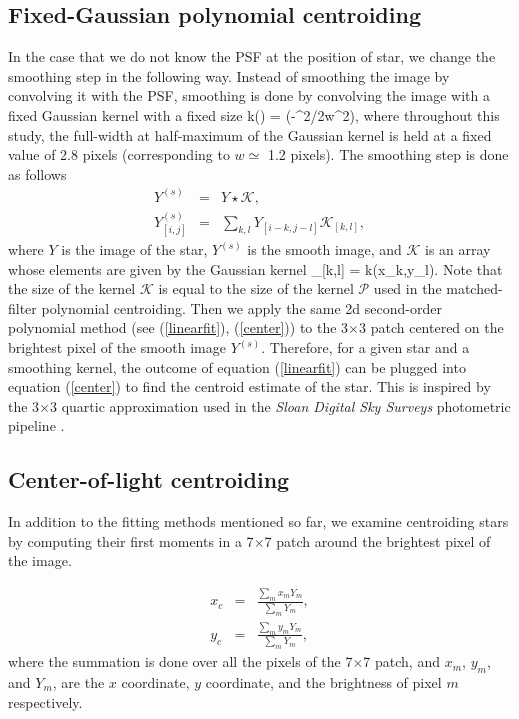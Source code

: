 \subsection{Fixed-Gaussian polynomial centroiding}
In the case that we do not know the PSF at the position of star, we change 
the smoothing step in the following way. Instead of smoothing the image 
by convolving it with the PSF, smoothing is done by convolving the image 
with a fixed Gaussian kernel with a fixed size 
\beq
k() = \exp(-^{2}/2w^{2}),
\label{eq:gauss}
\eeq
where throughout this study, the full-width at half-maximum of the Gaussian kernel is held at
a fixed value of 2.8 pixels (corresponding to $w \simeq$ 1.2 pixels). The smoothing step is done as follows
\begin{eqnarray}
Y^{(s)} &=& Y \star \mathcal{K}, \\
Y^{(s)}_{[i,j]} &=& \sum_{k,l}Y_{[i-k,j-l]}\mathcal{K}_{[k,l]},
\end{eqnarray}
where $Y$ is the image of the star, $Y^{(s)}$ is the smooth image, and $\mathcal{K}$ is an
array whose elements are given by the Gaussian kernel
\beq
{}_{[k,l]} = k(x_{k},y_{l}).
\eeq
Note that the size of the kernel $\mathcal{K}$ is equal to the size of the kernel $\mathcal{P}$ used in 
the matched-filter polynomial centroiding. Then we apply the same 2d second-order polynomial method (see (\ref{linearfit}), (\ref{center})) to the 3$\times$3 patch centered on the brightest
pixel of the smooth image $Y^{(s)}$. Therefore, for a given star and a smoothing kernel,
the outcome of equation (\ref{linearfit}) can be
plugged into equation (\ref{center}) to find the centroid estimate
of the star. This is inspired by the 3$\times$3 quartic approximation 
used in the \textsl{Sloan Digital Sky Surveys} photometric pipeline \citep{sdss}.

\subsection{Center-of-light centroiding}
In addition to the fitting methods 
mentioned so far, we examine centroiding 
stars by computing their first moments
in a 7$\times$7 patch around the brightest pixel of the image.

\begin{eqnarray}
x_{c} &=& \frac{\sum_{m}x_{m}Y_{m}}{\sum_{m}Y_{m}}, \\
y_{c} &=& \frac{\sum_{m}y_{m}Y_{m}}{\sum_{m}Y_{m}},
\end{eqnarray}
where the summation is done over all the pixels of the 7$\times$7 patch, and $x_{m}$, 
$y_{m}$, and $Y_{m}$, are the $x$ coordinate, $y$ coordinate, and the brightness
of pixel $m$ respectively.

